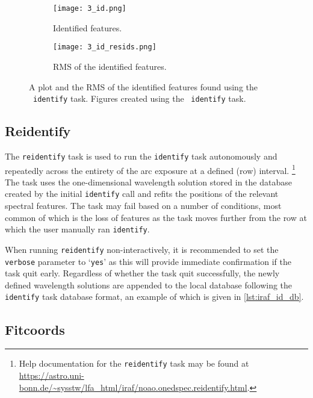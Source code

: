 \begin{figure}
    \centering
    \begin{subfigure}[b]{0.49\textwidth}
        \centering
        \texttt{[image: 3\_id.png]}
        \caption{Identified features.}
    \end{subfigure}
    \hfill
    \begin{subfigure}[b]{0.49\textwidth}
        \centering
        \texttt{[image: 3\_id\_resids.png]}
        \caption{\gls{RMS} of the identified features.}
    \end{subfigure}
    \caption{A plot and the \gls{RMS} of the identified features found using the \iraf\ \texttt{identify} task. Figures created using the \iraf\ \texttt{identify} task.}
    \label{fig:iraf_id_plot}
\end{figure}

\pagebreak

\subsection{Reidentify}

The \texttt{reidentify} task is used to run the \texttt{identify} task autonomously and repeatedly across the entirety of the arc exposure at a defined (row) interval.%
\footnote{Help documentation for the \texttt{reidentify} task may be found at \url{https://astro.uni-bonn.de/~sysstw/lfa_html/iraf/noao.onedspec.reidentify.html}.}
The task uses the one-dimensional wavelength solution stored in the database created by the initial \texttt{identify} call and refits the positions of the relevant spectral features. The task may fail based on a number of conditions, most common of which is the loss of features as the task moves further from the row at which the user manually ran \texttt{identify}.

When running \texttt{reidentify} non-interactively, it is recommended to set the \texttt{verbose} parameter to `\texttt{yes}' as this will provide immediate confirmation if the task quit early. Regardless of whether the task quit successfully, the newly defined wavelength solutions are appended to the local database following the \texttt{identify} task database format, an example of which is given in \autoref{lst:iraf_id_db}.

\subsection{Fitcoords} \label{subsec:iraf_fitcoords}

